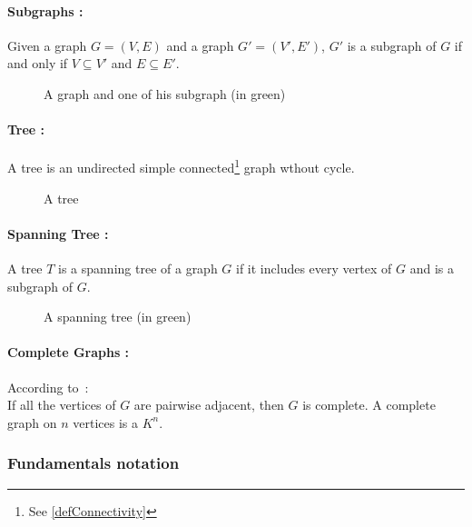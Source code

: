 \paragraph{Subgraphs :}
Given a graph $G = (V,E)$ and a graph $G' = (V',E')$, $G'$ is a subgraph of $G$ 
if and only if $V \subseteq V'$ and $E \subseteq E'$.

\begin{figure}[!h]
  \begin{center}
    
  \end{center}
  \caption{A graph and one of his subgraph (in green)}
\end{figure}

\paragraph{Tree :}
A tree is an undirected simple connected\footnote{See \ref{defConnectivity}}
graph wthout cycle.

\begin{figure}[!h]
  \begin{center}
    
  \end{center}
  \caption{A tree}
\end{figure}

\paragraph{Spanning Tree :}
A tree $T$ is a spanning tree of a graph $G$ if it includes every vertex of $G$ 
and is a subgraph of $G$.

\begin{figure}[!h]
  \begin{center}
    
  \end{center}
  \caption{A spanning tree (in green)}
\end{figure}

\paragraph{Complete Graphs :}
According to~\cite{Diestel}:\\
If all the vertices of $G$ are pairwise adjacent, then $G$ is complete. A
complete graph on $n$ vertices is a $K^n$.

\subsubsection{Fundamentals notation}
